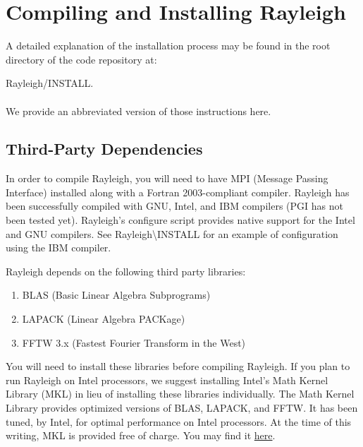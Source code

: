 \clearpage
\section{Compiling and Installing Rayleigh}\label{sec:installation}
A detailed explanation of the installation process may be found in the root directory of the code repository at:

Rayleigh/INSTALL.
\\
\\
\noindent We provide an abbreviated version of those instructions here.

\subsection{Third-Party Dependencies}
In order to compile Rayleigh, you will need to have MPI (Message Passing Interface) installed along with  a Fortran 2003-compliant compiler.   Rayleigh has been successfully compiled with GNU, Intel, and IBM compilers (PGI has not been tested yet).  Rayleigh's configure script provides native support for the Intel and GNU compilers.   See Rayleigh\textbackslash INSTALL for an example of configuration using the IBM compiler.

Rayleigh depends on the following third party libraries:
\begin{enumerate}
\item BLAS (Basic Linear Algebra Subprograms)
\item LAPACK (Linear Algebra PACKage)
\item FFTW 3.x (Fastest Fourier Transform in the West)
\end{enumerate}

You will need to install these libraries before compiling Rayleigh.   If you plan to run Rayleigh on Intel processors, we suggest installing Intel's Math Kernel Library (MKL) in lieu of installing these libraries individually.  The Math Kernel Library provides optimized versions of BLAS, LAPACK, and FFTW.  It has been tuned, by Intel, for optimal performance on Intel processors.   At the time of this writing, MKL is provided free of charge.  You may find it {\color{blue} \href{https://software.intel.com/en-us/mkl}{here}}.


